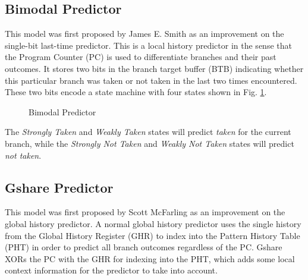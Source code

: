 \documentclass[conference]{IEEEtran}
\begin{document}
\subsection{Bimodal Predictor} \label{ssec::bimodal}
This model was first proposed by James E. Smith as an improvement on the single-bit last-time predictor\cite{smith1981}. This is a local history predictor in the sense that the Program Counter (PC) is used to differentiate branches and their past outcomes. It stores two bits in the branch target buffer (BTB) indicating whether this particular branch was taken or not taken in the last two times encountered. These two bits encode a state machine with four states shown in Fig. 
\ref{fig:bimodal}. 
\begin{figure}
    \centering
    \caption{Bimodal Predictor}
	\label{fig:bimodal}
\end{figure}
The \textit{Strongly Taken} and \textit{Weakly Taken} states will predict \textit{taken} for the current branch, while the \textit{Strongly Not Taken} and \textit{Weakly Not Taken} states will predict \textit{not taken}.

\subsection{Gshare Predictor} \label{ssec:gshare}
This model was first proposed by Scott McFarling as an improvement on the global history predictor\cite{mcfarling1993}. A normal global history predictor uses the single history from the Global History Register (GHR) to index into the Pattern History Table (PHT) in order to predict all branch outcomes regardless of the PC. Gshare XORs the PC with the GHR for indexing into the PHT, which adds some local context information for the predictor to take into account.
\end{document}
